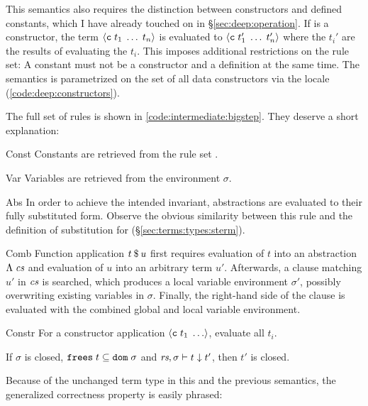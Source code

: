 This semantics also requires the distinction between constructors and defined constants, which I have already touched on in §\ref{sec:deep:operation}.
If  is a constructor, the term $\left\langle\texttt{\textup{c}}\;t_1\;\ldots\;t_n\right\rangle$ is evaluated to $\left\langle\texttt{\textup{c}}\;t'_1\;\ldots\;t'_n\right\rangle$ where the $t_i'$ are the results of evaluating the $t_i$.
This imposes additional restrictions on the rule set:
A constant must not be a constructor and a definition at the same time.
The semantics is parametrized on the set  of all data constructors via the  locale (\cref{code:deep:constructors}).

The full set of rules is shown in \cref{code:intermediate:bigstep}.
They deserve a short explanation:

\begin{semantics}
  \item[Const]
    Constants are retrieved from the rule set \rs.
  \item[Var]
    Variables are retrieved from the environment $\sigma$.
  \item[Abs]
    In order to achieve the intended invariant, abstractions are evaluated to their fully substituted form.
    Observe the obvious similarity between this rule and the definition of substitution for  (§\ref{sec:terms:types:sterm}).
  \item[Comb]
    Function application $t\mathbin{\$}u$ first requires evaluation of $t$ into an abstraction $\Lambda\;\textit{cs}$ and evaluation of $u$ into an arbitrary term $u'$.
    Afterwards, a clause matching $u'$ in $\textit{cs}$ is searched, which produces a local variable environment $\sigma'$, possibly overwriting existing variables in $\sigma$.
    Finally, the right-hand side of the clause is evaluated with the combined global and local variable environment.
  \item[Constr]
    For a constructor application $\left\langle\texttt{\textup{c}}\;t_1\;\ldots\right\rangle$, evaluate all $t_i$.
\end{semantics}

\begin{lemma}
  If $\sigma$ is closed, $\texttt{\textup{frees}}\;t \subseteq \texttt{\textup{dom}}\;\sigma$ and $\textit{rs}, \sigma \vdash t \downarrow t'$, then $t'$ is closed.
\end{lemma}

\noindent
Because of the unchanged term type in this and the previous semantics, the generalized correctness property is easily phrased:

